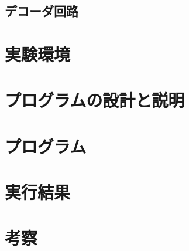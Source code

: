 \documentclass[a4paper,11pt,dvipdfmx]{jsarticle}
\begin{document}
\subsection{デコーダ回路}


\section{実験環境}

\section{プログラムの設計と説明}

\section{プログラム}

\section{実行結果}

\section{考察}
\end{document}
